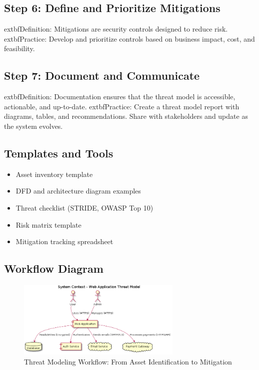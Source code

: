 \subsection*{Step 6: Define and Prioritize Mitigations}
	extbf{Definition:} Mitigations are security controls designed to reduce risk.\cite{owasp}
	extbf{Practice:} Develop and prioritize controls based on business impact, cost, and feasibility.

\subsection*{Step 7: Document and Communicate}
	extbf{Definition:} Documentation ensures that the threat model is accessible, actionable, and up-to-date.\cite{shostack2014}
	extbf{Practice:} Create a threat model report with diagrams, tables, and recommendations. Share with stakeholders and update as the system evolves.

\subsection*{Templates and Tools}
\begin{itemize}
	\item Asset inventory template
	\item DFD and architecture diagram examples
	\item Threat checklist (STRIDE, OWASP Top 10)
	\item Risk matrix template
	\item Mitigation tracking spreadsheet
\end{itemize}

\subsection*{Workflow Diagram}
\begin{figure}[H]
	\centering
	\includegraphics[width=0.7\textwidth]{images/system-context}
	\caption{Threat Modeling Workflow: From Asset Identification to Mitigation\cite{shostack2014}}
\end{figure}
